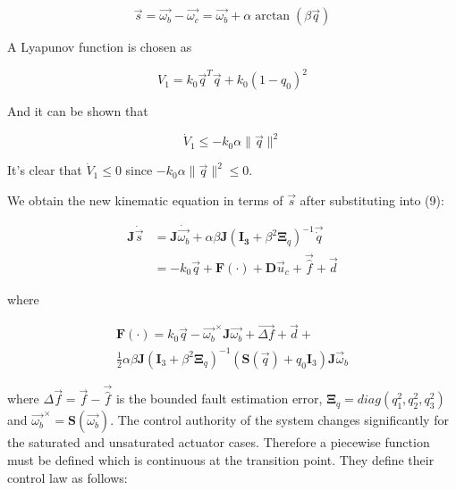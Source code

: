 \begin{equation}\vec{s}=\vec{\omega_{b}}-\vec{\omega_{c}}=\vec{\omega_{b}}+\alpha\arctan(\beta\vec{q})\end{equation}

A Lyapunov function is chosen as 

\begin{equation}V_{1}=k_{0}\vec{q}^T\vec{q}+k_{0}(1-q_{0})^2\end{equation}

And it can be shown that 



\begin{equation}\dot{V}_{1}\leq-k_{0}\alpha \lVert \vec{q} \rVert^{2}\end{equation}

It's clear that $\dot{V}_{1}\leq0$ since $-k_{0}\alpha \lVert \vec{q} \rVert^{2}\leq0$.


We obtain the new kinematic equation in terms of $\vec{s}$ after substituting into (9):

\begin{equation}
    \begin{split}
        \mathbf{J}\dot{\vec{s}}&=
        \mathbf{J}\dot{\vec{\omega_b}} + \alpha\beta\mathbf{J}(\mathbf{I_3}+\beta^2\mathbf{\Xi}_q)^{-1}\vec{\dot{q}}\\
        &=-k_0\vec{q}+\mathbf{F}(\cdot)+\mathbf{D}\vec{u}_{c}+\vec{\hat{f}}+\vec{d}
    \end{split}
\end{equation}

where

\begin{multline}
    \mathbf{F}(\cdot)=k_0\vec{q}-\vec{\omega_b}^{\times}\mathbf{J}\vec{\omega_b}+\vec{\Delta f} + \vec{d} + \\
    \frac{1}{2}\alpha\beta\mathbf{J}(\mathbf{I}_3+\beta^2\mathbf{\Xi}_q)^{-1}(\mathbf{S}(\vec{q})+q_0\mathbf{I}_3)\mathbf{J}\vec{\omega}_{b}
\end{multline}

where $\Delta \vec{f}=\vec{f}-\vec{\hat{f}}$ is the bounded fault estimation error,
$\mathbf{\Xi}_q=diag(q_1^2,q_2^2,q_3^2)$ and
$\vec{\omega_b}^{\times}=\mathbf{S}(\vec{\omega_b})$. 
The control authority of the system changes significantly for the saturated and unsaturated actuator cases. Therefore a piecewise function must be defined which is continuous at the transition point. They define their control law as follows:

